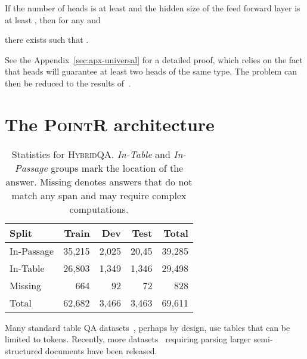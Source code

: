 \documentclass[11pt]{article}
\newcommand\hqa{\textsc{HybridQA}\xspace}
\newcommand{\pointr}{\textsc{PointR}\xspace}
\begin{document}
\begin{theorem}
If the number of heads is at least  and the hidden size of the feed forward layer is at least , then for any  and 
 
there exists  such that .
\label{theo:universal}
\end{theorem}

See the Appendix~\ref{sec:apx-universal} for a detailed proof, which relies on the fact that  heads will guarantee at least two heads of the same type. The problem can then be reduced to the results of~\citet{univapprox2020}.

\section{The \pointr architecture}
\label{sec:pointr}
\begin{table}[t]
\small
\centering
\begin{tabular}{lrrrr}
\toprule
Split & Train & Dev & Test & Total \\
\midrule
In-Passage  &  35,215 & 2,025  & 20,45  & 39,285 \\
In-Table & 26,803 & 1,349 & 1,346 & 29,498 \\
Missing & 664  & 92 & 72 & 828 \\
Total & 62,682 & 3,466 & 3,463 & 69,611 \\
\bottomrule
\end{tabular}
\caption{Statistics for \hqa. \emph{In-Table} and \emph{In-Passage} groups mark the location of the answer. Missing denotes answers that do not match any span and may require complex computations.}
\label{tab:hybridqa_data_split}
\end{table} 
Many standard table QA datasets~\cite{pasupat2015compositional, Chen2020TabFact, iyyer-etal-2017-search}, perhaps by design, use tables that can be limited to  tokens.
Recently, more datasets~\cite{kardas-etal-2020-axcell, talmor2021multimodalqa} requiring parsing larger semi-structured documents have been released.
\end{document}
